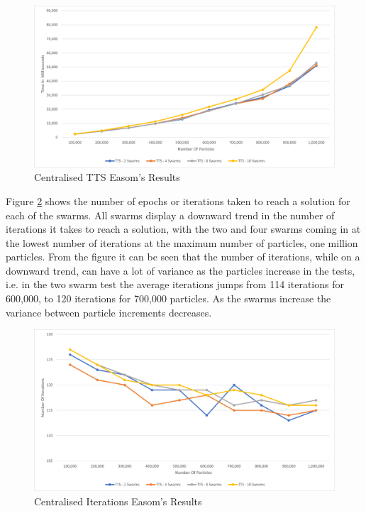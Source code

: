 \documentclass[oneside,12pt]{book}
\begin{document}
\begin{figure}[H]
    \centering
    \includegraphics[scale=0.45]{Images/Graphs/CentralisedEasomTTS.png}
    \caption{Centralised TTS Easom's Results}
    \label{fig:Centralised_TTS_Easom_Results}
\end{figure}

Figure \ref{fig:Centralised_Epoc_Easom_Results} shows the number of epochs or iterations taken to reach a solution for each of the swarms. All swarms display a downward trend in the number of iterations it takes to reach a solution, with the two and four swarms coming in at the lowest number of iterations at the maximum number of particles, one million particles. From the figure it can be seen that the number of iterations, while on a downward trend, can have a lot of variance as the particles increase in the tests, i.e. in the two swarm test the average iterations jumps from 114 iterations for 600,000, to 120 iterations for 700,000 particles. As the swarms increase the variance between particle increments decreases. 

\begin{figure}[H]
    \centering
    \includegraphics[scale=0.45]{Images/Graphs/CentralisedEasomEpoch.png}
    \caption{Centralised Iterations Easom's Results}
    \label{fig:Centralised_Epoc_Easom_Results}
\end{figure}
\end{document}

